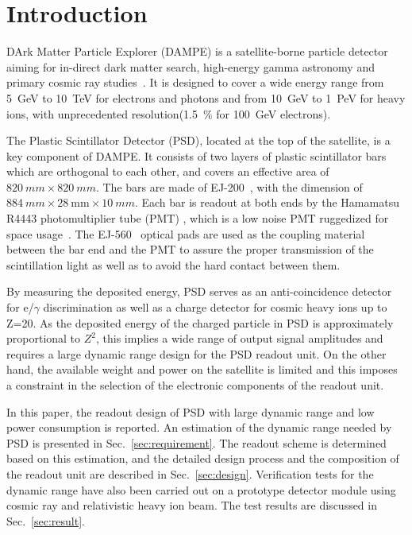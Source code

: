 \documentclass[preprint, times]{elsarticle}
\begin{document}
\section{Introduction}
\label{sec:introduction}

DArk Matter Particle Explorer (DAMPE) is a satellite-borne particle
detector aiming for in-direct dark matter search, high-energy gamma
astronomy and primary cosmic ray studies~\cite{Chang_Jin_dampe}. It is
designed to cover a wide energy range from \SI{5}{GeV} to
\SI{10}{TeV} for electrons and photons and from \SI{10}{GeV} to
\SI{1}{PeV} for heavy ions, with unprecedented
resolution(\SI{1.5}{\percent} for \SI{100}{\giga\electronvolt} electrons).

The Plastic Scintillator Detector (PSD), located at the top of the satellite, is a key component of DAMPE. 
It consists of two layers of plastic scintillator bars which are orthogonal to each other, and covers an effective area of
$\SI{820}{mm}\times\SI{820}{mm}$. 
The bars are made of EJ-200~\cite{scintillator}, with the dimension of $\SI{884}{mm} \times \SI{28}{\milli\meter} \times \SI{10}{mm}$.
Each bar  is readout at both ends by the Hamamatsu R4443 photomultiplier tube (PMT) , which is a low noise PMT ruggedized for space usage~\cite{r4443}. 
The EJ-560~\cite{scintillator} optical pads are used as the  coupling material between the bar end and the PMT to assure the proper transmission of the scintillation light as well as to avoid the hard contact between them.

By measuring the deposited energy, PSD serves as an anti-coincidence detector for e/$\gamma$ discrimination as well as a charge detector for cosmic heavy ions up to Z=20.
As the deposited energy of the charged particle in PSD is approximately proportional to $Z^2$, this implies a wide range of output signal amplitudes and requires a large dynamic range design for the PSD readout unit.
On the other hand, the available weight and power on the satellite is limited and this imposes a constraint in the selection of the electronic components of the readout unit.

In this paper, the readout design of PSD with large dynamic range and low power consumption is reported.
An estimation of the dynamic range needed by PSD is presented in Sec.~\ref{sec:requirement}.
The readout scheme is determined based on this estimation, and the detailed design process and the composition of the readout unit are described in Sec.~\ref{sec:design}.
Verification tests for the dynamic range have also been carried out on a prototype detector module using cosmic ray and relativistic heavy ion beam.
The test results are discussed in Sec.~\ref{sec:result}.
\end{document}
